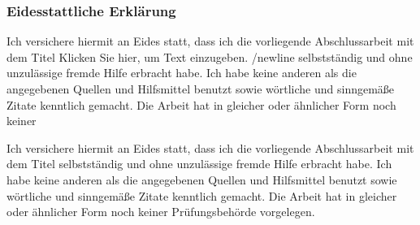 \subsubsection{Eidesstattliche Erklärung}
Ich versichere hiermit an Eides statt, dass ich die vorliegende Abschlussarbeit mit dem Titel
Klicken Sie hier, um Text einzugeben. /newline
selbstständig und ohne unzulässige fremde Hilfe erbracht habe. Ich habe keine anderen als die angegebenen Quellen und Hilfsmittel benutzt sowie wörtliche und sinngemäße Zitate kenntlich gemacht. Die Arbeit hat in gleicher oder ähnlicher Form noch keiner 

Ich versichere hiermit an Eides statt, dass ich die vorliegende Abschlussarbeit mit dem Titel 
selbstständig und ohne unzulässige fremde Hilfe erbracht habe. Ich habe keine anderen als die angegebenen Quellen und Hilfsmittel benutzt sowie wörtliche und sinngemäße Zitate kenntlich gemacht. Die Arbeit hat in gleicher oder ähnlicher Form noch keiner Prüfungsbehörde vorgelegen.


